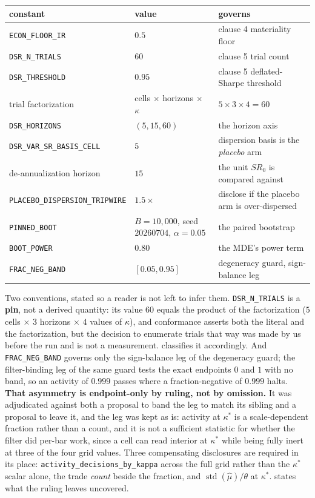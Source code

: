 \begin{center}
\small
\begin{tabularx}{\linewidth}{llX}
\toprule
constant & value & governs \\
\midrule
\texttt{ECON\_FLOOR\_IR} & $0.5$ & clause 4 materiality floor \\
\texttt{DSR\_N\_TRIALS} & $60$ & clause 5 trial count \\
\texttt{DSR\_THRESHOLD} & $0.95$ & clause 5 deflated-Sharpe threshold \\
trial factorization & cells $\times$ horizons $\times$ $\kappa$ & $5 \times 3 \times 4 = 60$ \\
\texttt{DSR\_HORIZONS} & $(5, 15, 60)$ & the horizon axis \\
\texttt{DSR\_VAR\_SR\_BASIS\_CELL} & $5$ & dispersion basis is the \emph{placebo} arm \\
de-annualization horizon & $15$ & the unit $SR_0$ is compared against \\
\texttt{PLACEBO\_DISPERSION\_TRIPWIRE} & $1.5\times$ & disclose if the placebo arm is over-dispersed \\
\texttt{PINNED\_BOOT} & $B = 10{,}000$, seed $20260704$, $\alpha = 0.05$ & the paired bootstrap \\
\texttt{BOOT\_POWER} & $0.80$ & the MDE's power term \\
\texttt{FRAC\_NEG\_BAND} & $[0.05, 0.95]$ & degeneracy guard, sign-balance leg \\
\bottomrule
\end{tabularx}
\end{center}

Two conventions, stated so a reader is not left to infer them. \texttt{DSR\_N\_TRIALS} is a
\textbf{pin}, not a derived quantity: its value $60$ equals the product of the factorization
($5$ cells $\times$ $3$ horizons $\times$ $4$ values of $\kappa$), and conformance asserts both the
literal and the factorization, but the decision to enumerate trials that way was made by us before
the run and is not a measurement.  classifies it accordingly. And
\texttt{FRAC\_NEG\_BAND} governs only the sign-balance leg of the degeneracy guard; the
filter-binding leg of the same guard tests the exact endpoints $0$ and $1$ with no band, so an
activity of $0.999$ passes where a fraction-negative of $0.999$ halts. \textbf{That asymmetry is
endpoint-only by ruling, not by omission.} It was adjudicated against both a proposal to band the
leg to match its sibling and a proposal to leave it, and the leg was kept as is: activity at
$\kappa^\ast$ is a scale-dependent fraction rather than a count, and it is not a sufficient
statistic for whether the filter did per-bar work, since a cell can read interior at
$\kappa^\ast$ while being fully inert at three of the four grid values. Three compensating
disclosures are required in its place: \texttt{activity\_decisions\_by\_kappa} across the full
grid rather than the $\kappa^\ast$ scalar alone, the trade \emph{count} beside the fraction, and
$\operatorname{std}(\hat{\mu})/\theta$ at $\kappa^\ast$.  states what the
ruling leaves uncovered.

